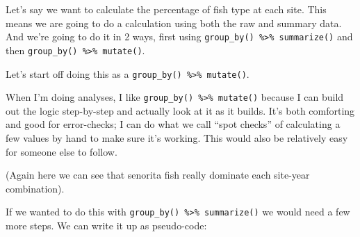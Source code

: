 \documentclass[]{book}
\newenvironment{Shaded}{\begin{snugshade}}{\end{snugshade}}
\newcommand{\CommentTok}[1]{\textcolor[rgb]{0.56,0.35,0.01}{\textit{#1}}}
\newcommand{\DataTypeTok}[1]{\textcolor[rgb]{0.13,0.29,0.53}{#1}}
\newcommand{\DecValTok}[1]{\textcolor[rgb]{0.00,0.00,0.81}{#1}}
\newcommand{\KeywordTok}[1]{\textcolor[rgb]{0.13,0.29,0.53}{\textbf{#1}}}
\newcommand{\NormalTok}[1]{#1}
\newcommand{\OperatorTok}[1]{\textcolor[rgb]{0.81,0.36,0.00}{\textbf{#1}}}
\newcommand{\StringTok}[1]{\textcolor[rgb]{0.31,0.60,0.02}{#1}}
\begin{document}
Let's say we want to calculate the percentage of fish type at each site. This means we are going to do a calculation using both the raw and summary data. And we're going to do it in 2 ways, first using \texttt{group\_by()\ \%\textgreater{}\%\ summarize()} and then \texttt{group\_by()\ \%\textgreater{}\%\ mutate()}.

Let's start off doing this as a \texttt{group\_by()\ \%\textgreater{}\%\ mutate()}.

\begin{Shaded}
\end{Shaded}

When I'm doing analyses, I like \texttt{group\_by()\ \%\textgreater{}\%\ mutate()} because I can build out the logic step-by-step and actually look at it as it builds. It's both comforting and good for error-checks; I can do what we call ``spot checks'' of calculating a few values by hand to make sure it's working. This would also be relatively easy for someone else to follow.

(Again here we can see that senorita fish really dominate each site-year combination).

If we wanted to do this with \texttt{group\_by()\ \%\textgreater{}\%\ summarize()} we would need a few more steps. We can write it up as pseudo-code:

\begin{Shaded}
\end{Shaded}
\end{document}
